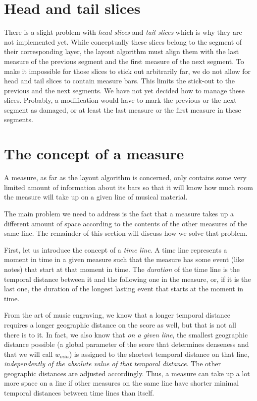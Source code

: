 \documentclass[11pt]{book}
\begin{document}
\section{Head and tail slices}

There is a slight problem with \emph{head slices} and \emph{tail
slices} which is why they are not implemented yet.  While
conceptually these slices belong to the segment of their
corresponding layer, the layout algorithm must align them with the
last measure of the previous segment and the first measure of the
next segment.  To make it impossible for those slices to stick out
arbitrarily far, we do not allow for head and tail slices to contain
measure bars.  This limits the stick-out to the previous and the
next segments.  We have not yet decided how to manage these slices.
Probably, a modification would have to mark the previous or the next
segment as damaged, or at least the last measure or the first measure
in these segments.  

\section{The concept of a measure}

A measure, as far as the layout algorithm is concerned, only contains
some very limited amount of information about its bars so that it will
know how much room the measure will take up on a given line of musical
material. 

The main problem we need to address is the fact that a measure takes
up a different amount of space according to the contents of the other
measures of the same line.  The remainder of this section will discuss
how we solve that problem.

First, let us introduce the concept of a \emph{time line}. A time line represents a moment in time in a given measure such
that the measure has some event (like notes) that start at that moment
in time.  The \emph{duration} of the
time line is the temporal distance between it and the following one in
the measure, or, if it is the last one, the duration of the longest
lasting event that starts at the moment in time. 

From the art of music engraving, we know that a longer temporal
distance requires a longer geographic distance on the score as well,
but that is not all there is to it.  In fact, we also know that
\emph{on a given line}, the smallest geographic distance possible (a
global parameter of the score that determines denseness and that we
will call $w_{min}$) is assigned to the shortest temporal distance on
that line, \emph{independently of the absolute value of that temporal
distance}. The other geographic distances are adjusted accordingly.
Thus, a measure can take up a lot more space on a line if other
measures on the same line have shorter minimal temporal distances
between time lines than itself.
\end{document}

